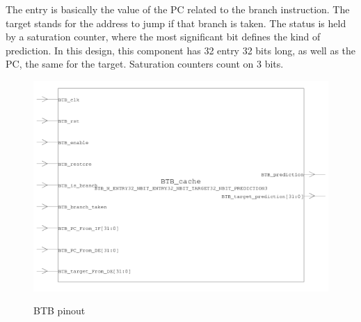 The entry is basically the value of the PC related to the branch instruction. The target stands for the address to jump if that branch is taken. The status is held by a saturation counter, where the most significant bit defines the kind of prediction. In this design, this component has 32 entry 32 bits long, as well as the PC, the same for the target. Saturation counters count on 3 bits. 
\begin{figure}[H]
\centering
\includegraphics[scale=.7]{Immagini/08}
\label{02}
\caption{BTB pinout}
\end{figure}

